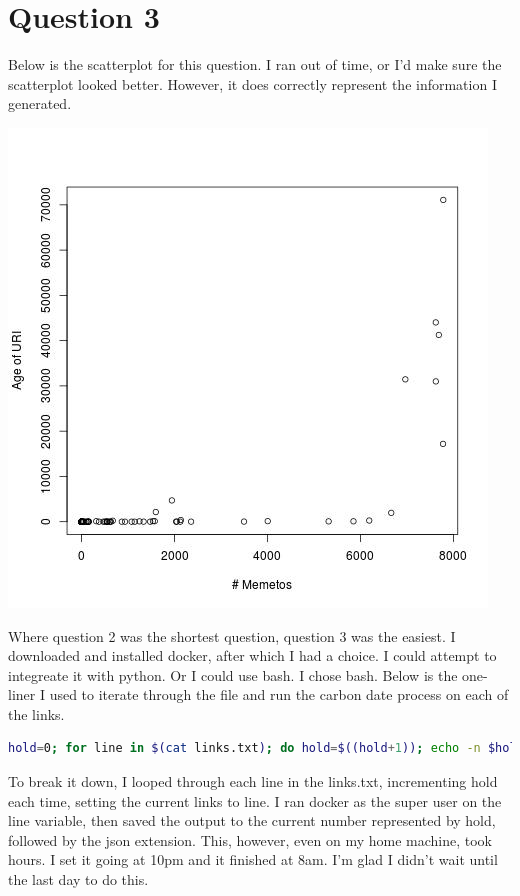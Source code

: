 \documentclass{article}
\begin{document}
\section{Question 3}

Below is the scatterplot for this question. I ran out of time, or I'd make sure the scatterplot looked better. However, it does correctly represent the information I generated.
\begin{center}
\includegraphics[scale=0.6]{images/plot2.jpeg}
\end{center}

Where question 2 was the shortest question, question 3 was the easiest. I downloaded and installed docker, after which I had a choice. I could attempt to integreate it with python. Or I could use bash. I chose bash. Below is the one-liner I used to iterate through the file and run the carbon date process on each of the links.
\begin{lstlisting}[language=bash]
hold=0; for line in $(cat links.txt); do hold=$((hold+1)); echo -n $hold; echo ": $line"; sudo docker run --rm -it oduwsdl/carbondate ./main.py -l search $line > "$hold.json"; done
\end{lstlisting}

To break it down, I looped through each line in the links.txt, incrementing hold each time, setting the current links to line. I ran docker as the super user on the line variable, then saved the output to the current number represented by hold, followed by the json extension. This, however, even on my home machine, took hours. I set it going at 10pm and it finished at 8am. I'm glad I didn't wait until the last day to do this.
\end{document}
